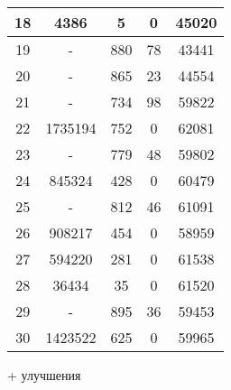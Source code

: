 \begin{table}[]
\begin{tabular}{|c|c|c|c|c|}
18      & 4386                & 5        & 0                                   & 45020    \\ \hline
19      & -                   & 880      & 78                                  & 43441    \\ \hline
20      & -                   & 865      & 23                                  & 44554    \\ \hline
21      & -                   & 734      & 98                                  & 59822    \\ \hline
22      & 1735194             & 752      & 0                                   & 62081    \\ \hline
23      & -                   & 779      & 48                                  & 59802    \\ \hline
24      & 845324              & 428      & 0                                   & 60479    \\ \hline
25      & -                   & 812      & 46                                  & 61091    \\ \hline
26      & 908217              & 454      & 0                                   & 58959    \\ \hline
27      & 594220              & 281      & 0                                   & 61538    \\ \hline
28      & 36434               & 35       & 0                                   & 61520    \\ \hline
29      & -                   & 895      & 36                                  & 59453    \\ \hline
30      & 1423522             & 625      & 0                                   & 59965    \\ \hline
\end{tabular}
\end{table}
+ улучшения
